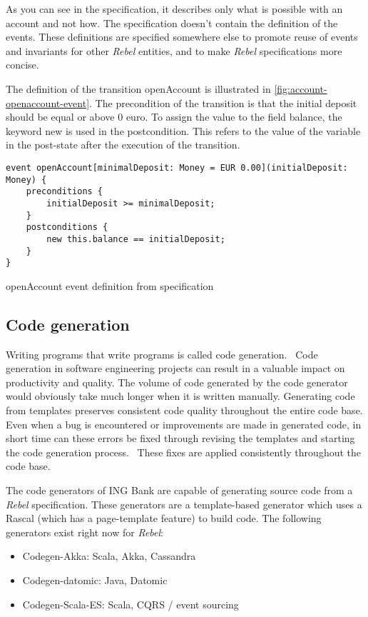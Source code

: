 As you can see in the specification, it describes only what is possible with an account and not how. The specification doesn't contain the definition of the events. These definitions are specified somewhere else to promote reuse of events and invariants for other \textit{Rebel} entities, and to make \textit{Rebel} specifications more concise.~\cite[p.~4]{stoel_storm_vinju_bosman_2016}

The definition of the transition openAccount is illustrated in \autoref{fig:account-openaccount-event}. The precondition of the transition is that the initial deposit should be equal or above 0 euro. To assign the value to the field balance, the keyword new is used in the postcondition. This refers to the value of the variable in the post-state after the execution of the transition.~\cite[p.~4]{stoel_storm_vinju_bosman_2016}

\begin{sourcecode}[h!]
\begin{lstlisting}[]
event openAccount[minimalDeposit: Money = EUR 0.00](initialDeposit: Money) {
	preconditions {
		initialDeposit >= minimalDeposit;
	}
	postconditions {
		new this.balance == initialDeposit;
	}
}
\end{lstlisting}
\caption{openAccount event definition from specification}
\label{fig:account-openaccount-event}
\end{sourcecode}
\FloatBarrier

\subsection{Code generation}

Writing programs that write programs is called code generation.~\cite[p.~3]{herrington2003code} Code generation in software engineering projects can result in a valuable impact on productivity and quality. The volume of code generated by the code generator would obviously take much longer when it is written manually. Generating code from templates preserves consistent code quality throughout the entire code base. Even when a bug is encountered or improvements are made in generated code, in short time can these errors be fixed through revising the templates and starting the code generation process.~\cite[p.~15-17]{herrington2003code} These fixes are applied consistently throughout the code base. 

The code generators of ING Bank are capable of generating source code from a \textit{Rebel} specification. These generators are a template-based generator which uses a Rascal (which has a page-template feature)\cite{RascalGTTSE} to build code. The following generators exist right now for \textit{Rebel}:
\begin{itemize}
\item Codegen-Akka: Scala, Akka, Cassandra
\item Codegen-datomic: Java, Datomic
\item Codegen-Scala-ES: Scala, CQRS / event sourcing
\end{itemize}

